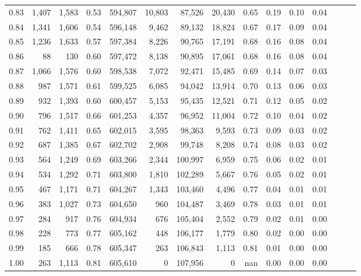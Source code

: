 \begin{tabular}{rrrrrrrrrrrrrrr}
0.83 &   1,407 &  1,583 &  0.53 &  594,807 &   10,803 &   87,526 &   20,430 &  0.65 &  0.19 &  0.10 &      0.04 \\
0.84 &   1,341 &  1,606 &  0.54 &  596,148 &    9,462 &   89,132 &   18,824 &  0.67 &  0.17 &  0.09 &      0.04 \\
0.85 &   1,236 &  1,633 &  0.57 &  597,384 &    8,226 &   90,765 &   17,191 &  0.68 &  0.16 &  0.08 &      0.04 \\
0.86 &      88 &    130 &  0.60 &  597,472 &    8,138 &   90,895 &   17,061 &  0.68 &  0.16 &  0.08 &      0.04 \\
0.87 &   1,066 &  1,576 &  0.60 &  598,538 &    7,072 &   92,471 &   15,485 &  0.69 &  0.14 &  0.07 &      0.03 \\
0.88 &     987 &  1,571 &  0.61 &  599,525 &    6,085 &   94,042 &   13,914 &  0.70 &  0.13 &  0.06 &      0.03 \\
0.89 &     932 &  1,393 &  0.60 &  600,457 &    5,153 &   95,435 &   12,521 &  0.71 &  0.12 &  0.05 &      0.02 \\
0.90 &     796 &  1,517 &  0.66 &  601,253 &    4,357 &   96,952 &   11,004 &  0.72 &  0.10 &  0.04 &      0.02 \\
0.91 &     762 &  1,411 &  0.65 &  602,015 &    3,595 &   98,363 &    9,593 &  0.73 &  0.09 &  0.03 &      0.02 \\
0.92 &     687 &  1,385 &  0.67 &  602,702 &    2,908 &   99,748 &    8,208 &  0.74 &  0.08 &  0.03 &      0.02 \\
0.93 &     564 &  1,249 &  0.69 &  603,266 &    2,344 &  100,997 &    6,959 &  0.75 &  0.06 &  0.02 &      0.01 \\
0.94 &     534 &  1,292 &  0.71 &  603,800 &    1,810 &  102,289 &    5,667 &  0.76 &  0.05 &  0.02 &      0.01 \\
0.95 &     467 &  1,171 &  0.71 &  604,267 &    1,343 &  103,460 &    4,496 &  0.77 &  0.04 &  0.01 &      0.01 \\
0.96 &     383 &  1,027 &  0.73 &  604,650 &      960 &  104,487 &    3,469 &  0.78 &  0.03 &  0.01 &      0.01 \\
0.97 &     284 &    917 &  0.76 &  604,934 &      676 &  105,404 &    2,552 &  0.79 &  0.02 &  0.01 &      0.00 \\
0.98 &     228 &    773 &  0.77 &  605,162 &      448 &  106,177 &    1,779 &  0.80 &  0.02 &  0.00 &      0.00 \\
0.99 &     185 &    666 &  0.78 &  605,347 &      263 &  106,843 &    1,113 &  0.81 &  0.01 &  0.00 &      0.00 \\
1.00 &     263 &  1,113 &  0.81 &  605,610 &        0 &  107,956 &        0 &   nan &  0.00 &  0.00 &      0.00 \\
\bottomrule
\end{tabular}
